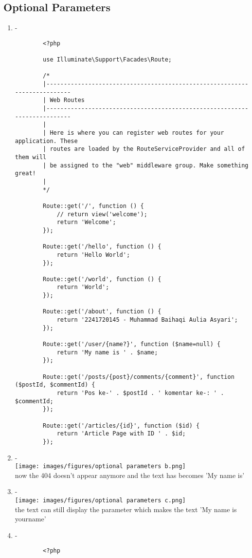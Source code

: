 \documentclass[12pt,titlepage]{article}
\begin{document}
\subsection{Optional Parameters}
\begin{enumerate}[label=\alph*.]
    \item -
    \begin{verbatim}
        <?php

        use Illuminate\Support\Facades\Route;
        
        /*
        |--------------------------------------------------------------------------
        | Web Routes
        |--------------------------------------------------------------------------
        |
        | Here is where you can register web routes for your application. These
        | routes are loaded by the RouteServiceProvider and all of them will
        | be assigned to the "web" middleware group. Make something great!
        |
        */
        
        Route::get('/', function () {
            // return view('welcome');
            return 'Welcome';
        });
        
        Route::get('/hello', function () {
            return 'Hello World';
        });
        
        Route::get('/world', function () {
            return 'World';
        }); 
        
        Route::get('/about', function () {
            return '2241720145 - Muhammad Baihaqi Aulia Asyari';
        }); 
        
        Route::get('/user/{name?}', function ($name=null) {
            return 'My name is ' . $name;
        }); 
        
        Route::get('/posts/{post}/comments/{comment}', function ($postId, $commentId) {
            return 'Pos ke-' . $postId . ' komentar ke-: ' . $commentId;
        });
        
        Route::get('/articles/{id}', function ($id) {
            return 'Article Page with ID ' . $id;
        });      
    \end{verbatim}
    \item - \\ \texttt{[image: images/figures/optional parameters b.png]} \\ now the 404 doesn't appear anymore and the text has becomes 'My name is'
    \item - \\ \texttt{[image: images/figures/optional parameters c.png]} \\ the text can still display the parameter which makes the text 'My name is yourname'
    \item -
    \begin{verbatim}
        <?php


\end{verbatim}
\end{enumerate}
\end{document}
